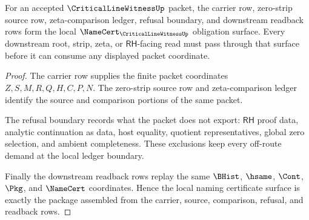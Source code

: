 \begin{theorem}
\label{thm:critical-line-witness-namecert-obligation-package}
For an accepted $\CriticalLineWitnessUp$ packet, the carrier row, zero-strip source row, zeta-comparison ledger, refusal boundary, and downstream readback rows form the local $\NameCert_{\CriticalLineWitnessUp}$ obligation surface. Every downstream root, strip, zeta, or $\mathsf{RH}$-facing read must pass through that surface before it can consume any displayed packet coordinate.
\end{theorem}
\begin{proof}
The carrier row supplies the finite packet coordinates $Z,S,M,R,Q,H,C,P,N$. The zero-strip source row and zeta-comparison ledger identify the source and comparison portions of the same packet.

The refusal boundary records what the packet does not export: $\mathsf{RH}$ proof data, analytic continuation as data, host equality, quotient representatives, global zero selection, and ambient completeness. These exclusions keep every off-route demand at the local ledger boundary.

Finally the downstream readback rows replay the same $\BHist$, $\hsame$, $\Cont$, $\Pkg$, and $\NameCert$ coordinates. Hence the local naming certificate surface is exactly the package assembled from the carrier, source, comparison, refusal, and readback rows.
\end{proof}

